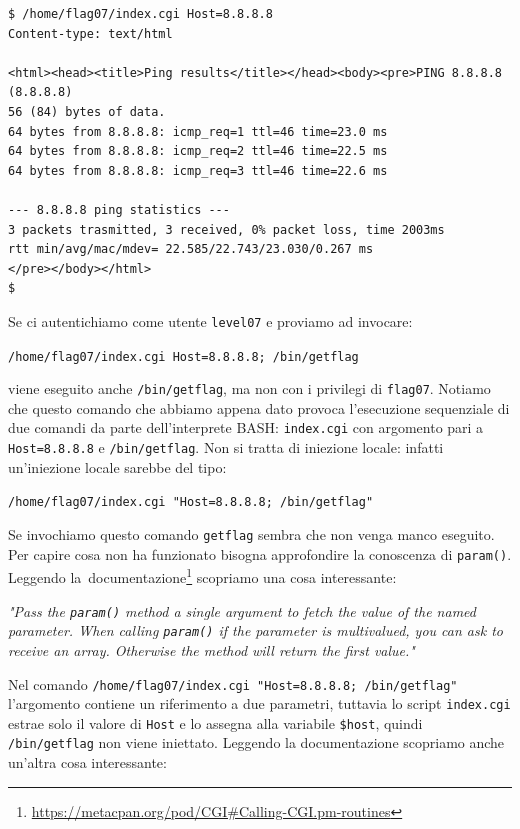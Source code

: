 \begin{mdframed}[backgroundcolor=white!20,shadow=false]
\begin{lstlisting}
$ /home/flag07/index.cgi Host=8.8.8.8
Content-type: text/html

<html><head><title>Ping results</title></head><body><pre>PING 8.8.8.8 (8.8.8.8)
56 (84) bytes of data.
64 bytes from 8.8.8.8: icmp_req=1 ttl=46 time=23.0 ms
64 bytes from 8.8.8.8: icmp_req=2 ttl=46 time=22.5 ms
64 bytes from 8.8.8.8: icmp_req=3 ttl=46 time=22.6 ms

--- 8.8.8.8 ping statistics ---
3 packets trasmitted, 3 received, 0% packet loss, time 2003ms
rtt min/avg/mac/mdev= 22.585/22.743/23.030/0.267 ms
</pre></body></html>
$
\end{lstlisting}
\end{mdframed}
Se ci autentichiamo come utente \texttt{level07} e proviamo ad invocare:
\begin{center}
    \texttt{/home/flag07/index.cgi Host=8.8.8.8; /bin/getflag}
\end{center}
viene eseguito anche \texttt{/bin/getflag}, ma non con i privilegi di \texttt{flag07}. Notiamo che questo comando che abbiamo appena dato provoca l'esecuzione sequenziale di due comandi da parte dell'interprete BASH: \texttt{index.cgi} con argomento pari a \texttt{Host=8.8.8.8} e \texttt{/bin/getflag}. Non si tratta di iniezione locale: infatti un'iniezione locale sarebbe del tipo:
\begin{center}
    \texttt{/home/flag07/index.cgi "Host=8.8.8.8; /bin/getflag"}
\end{center}
Se invochiamo questo comando \texttt{getflag} sembra che non venga manco eseguito. Per capire cosa non ha funzionato bisogna approfondire la conoscenza di \texttt{param()}. Leggendo la\ documentazione\footnote{\href{https://metacpan.org/pod/CGI\#Calling-CGI.pm-routines}{https://metacpan.org/pod/CGI\#Calling-CGI.pm-routines}} scopriamo una cosa interessante:

\vspace{5mm}

\textit{"Pass the \texttt{param()} method a single argument
to fetch the value of the named parameter.
When calling \texttt{param()} if the parameter is
multivalued, you can ask to receive an array.
Otherwise the method will return
the first value."
}

\vspace{5mm}

Nel comando \texttt{/home/flag07/index.cgi "Host=8.8.8.8; /bin/getflag"} l'argomento contiene un riferimento a due parametri, tuttavia lo script \texttt{index.cgi} estrae solo il valore di \texttt{Host} e lo assegna alla variabile \texttt{\$host}, quindi \texttt{/bin/getflag} non viene iniettato. Leggendo la documentazione scopriamo anche un'altra cosa interessante:

